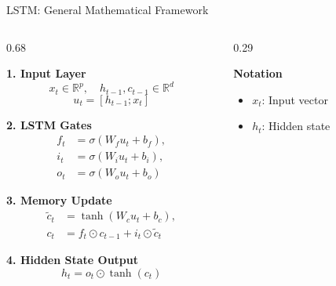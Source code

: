 \documentclass[xcolor={table}, aspectratio=169]{beamer}
\begin{document}
\begin{frame}{LSTM: General Mathematical Framework}

\footnotesize
\setlength{\abovedisplayskip}{4pt}
\setlength{\belowdisplayskip}{4pt}

\begin{columns}[T,onlytextwidth]

\begin{column}{0.68\textwidth}

\textbf{1. Input Layer}
\[
x_t\in\mathbb{R}^{p},\quad
h_{t-1},c_{t-1}\in\mathbb{R}^{d}
\]
\[
u_t=[h_{t-1};x_t]
\]

\vspace{0.1cm}

\textbf{2. LSTM Gates}
\[
\begin{aligned}
f_t &= \sigma(W_f u_t+b_f),\\
i_t &= \sigma(W_i u_t+b_i),\\
o_t &= \sigma(W_o u_t+b_o)
\end{aligned}
\]

\vspace{0.1cm}

\textbf{3. Memory Update}
\[
\begin{aligned}
\tilde{c}_t
&=\tanh(W_c u_t+b_c),\\
c_t
&=f_t\odot c_{t-1}
+i_t\odot\tilde{c}_t
\end{aligned}
\]

\vspace{0.1cm}

\textbf{4. Hidden State Output}
\[
\boxed{
h_t=o_t\odot\tanh(c_t)
}
\]

\end{column}

\begin{column}{0.29\textwidth}

\textbf{Notation}

\vspace{0.15cm}

\begin{itemize}
    \setlength{\itemsep}{0.18cm}

    \item $x_t$:
    Input vector

    \item $h_t$:
    Hidden state


\end{itemize}
\end{column}
\end{columns}
\end{frame}
\end{document}
